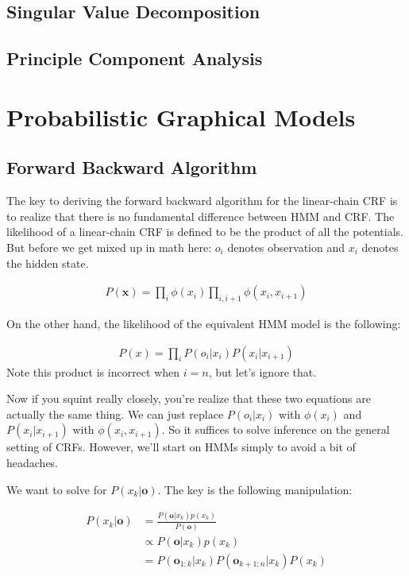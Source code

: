 \documentclass[12pt]{article}
\newcommand{\eq}[1]{\begin{align*}#1\end{align*}}
\begin{document}
\subsection{Singular Value Decomposition}

\subsection{Principle Component Analysis}

\section{Probabilistic Graphical Models}

\subsection{Forward Backward Algorithm}

\renewcommand{\o}{\mathbf{o}}
\newcommand{\x}{\mathbf{x}}

The key to deriving the forward backward algorithm for the linear-chain CRF is to realize that there is no fundamental difference between HMM and CRF.
The likelihood of a linear-chain CRF is defined to be the product of all the potentials. But before we get mixed up in math here: $o_i$ denotes observation and $x_i$ denotes the hidden state.

\eq{
P(\x) = \prod_i \phi(x_i) \prod_{i,i+1} \phi(x_i, x_{i+1})
}

On the other hand, the likelihood of the equivalent HMM model is the following:

\eq{
P(x) = \prod_i P(o_i | x_i) P(x_i | x_{i+1})
}
Note this product is incorrect when $i = n$, but let's ignore that.

Now if you squint really closely, you're realize that these two equations are actually the same thing. We can just replace $P(o_i|x_i)$ with $\phi(x_i)$ and $P(x_i|x_{i+1})$ with $\phi(x_i, x_{i+1})$. So it suffices to solve inference on the general setting of CRFs. However, we'll start on HMMs simply to avoid a bit of headaches.

We want to solve for $P(x_k|\o)$. The key is the following manipulation:

\eq{
  P(x_k|\o) &= \frac{P(\o|x_k)p(x_k)}{P(\o)} \\
  &\propto P(\o|x_k)p(x_k) \\
  &= P(\o_{1:k}|x_k)P(\o_{k+1:n}|x_k)P(x_k) \\
}
\end{document}
